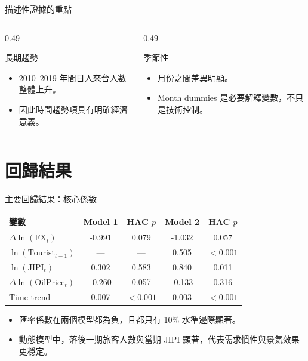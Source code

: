 \documentclass[aspectratio=169]{ctexbeamer}
\begin{document}
\begin{frame}{描述性證據的重點}
\begin{columns}[T]
  \begin{column}{0.49\textwidth}
    \begin{block}{長期趨勢}
    \begin{itemize}
      \item 2010--2019 年間日人來台人數整體上升。
      \item 因此時間趨勢項具有明確經濟意義。
    \end{itemize}
    \end{block}
  \end{column}
  \begin{column}{0.49\textwidth}
    \begin{block}{季節性}
    \begin{itemize}
      \item 月份之間差異明顯。
      \item Month dummies 是必要解釋變數，不只是技術控制。
    \end{itemize}
    \end{block}
  \end{column}
\end{columns}
\end{frame}

\section{回歸結果}

\begin{frame}{主要回歸結果：核心係數}
\small
\begin{tabular}{lcccc}
\toprule
變數 & Model 1 & HAC $p$ & Model 2 & HAC $p$ \\
\midrule
$\Delta \ln(\mathrm{FX}_t)$ & -0.991 & 0.079 & -1.032 & 0.057 \\
$\ln(\mathrm{Tourist}_{t-1})$ & --- & --- & 0.505 & $<0.001$ \\
$\ln(\mathrm{JIPI}_t)$ & 0.302 & 0.583 & 0.840 & 0.011 \\
$\Delta \ln(\mathrm{OilPrice}_t)$ & -0.260 & 0.057 & -0.133 & 0.316 \\
Time trend & 0.007 & $<0.001$ & 0.003 & $<0.001$ \\
\bottomrule
\end{tabular}
\vspace{0.5em}
\begin{itemize}
  \item 匯率係數在兩個模型都為負，且都只有 10\% 水準邊際顯著。
  \item 動態模型中，落後一期旅客人數與當期 JIPI 顯著，代表需求慣性與景氣效果更穩定。
\end{itemize}
\end{frame}
\end{document}
